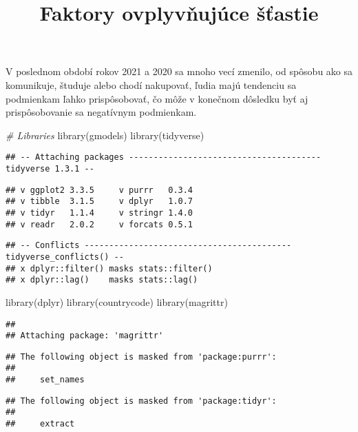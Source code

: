 \documentclass[
]{article}
\title{Faktory ovplyvňujúce šťastie}
\author{}
\date{\vspace{-2.5em}}
\newenvironment{Shaded}{\begin{snugshade}}{\end{snugshade}}
\newcommand{\CommentTok}[1]{\textcolor[rgb]{0.56,0.35,0.01}{\textit{#1}}}
\newcommand{\FunctionTok}[1]{\textcolor[rgb]{0.00,0.00,0.00}{#1}}
\newcommand{\NormalTok}[1]{#1}
\begin{document}
\maketitle

V poslednom období rokov 2021 a 2020 sa mnoho vecí zmenilo, od spôsobu
ako sa komunikuje, študuje alebo chodí nakupovať, ľudia majú tendenciu
sa podmienkam ľahko prispôsobovať, čo môže v konečnom dôsledku byť aj
prispôsobovanie sa negatívnym podmienkam.

\begin{Shaded}
\begin{Highlighting}[]
\CommentTok{\# Libraries}
\FunctionTok{library}\NormalTok{(gmodels)}
\FunctionTok{library}\NormalTok{(tidyverse)}
\end{Highlighting}
\end{Shaded}

\begin{verbatim}
## -- Attaching packages --------------------------------------- tidyverse 1.3.1 --
\end{verbatim}

\begin{verbatim}
## v ggplot2 3.3.5     v purrr   0.3.4
## v tibble  3.1.5     v dplyr   1.0.7
## v tidyr   1.1.4     v stringr 1.4.0
## v readr   2.0.2     v forcats 0.5.1
\end{verbatim}

\begin{verbatim}
## -- Conflicts ------------------------------------------ tidyverse_conflicts() --
## x dplyr::filter() masks stats::filter()
## x dplyr::lag()    masks stats::lag()
\end{verbatim}

\begin{Shaded}
\begin{Highlighting}[]
\FunctionTok{library}\NormalTok{(dplyr)}
\FunctionTok{library}\NormalTok{(countrycode)}
\FunctionTok{library}\NormalTok{(magrittr)}
\end{Highlighting}
\end{Shaded}

\begin{verbatim}
## 
## Attaching package: 'magrittr'
\end{verbatim}

\begin{verbatim}
## The following object is masked from 'package:purrr':
## 
##     set_names
\end{verbatim}

\begin{verbatim}
## The following object is masked from 'package:tidyr':
## 
##     extract
\end{verbatim}
\end{document}
